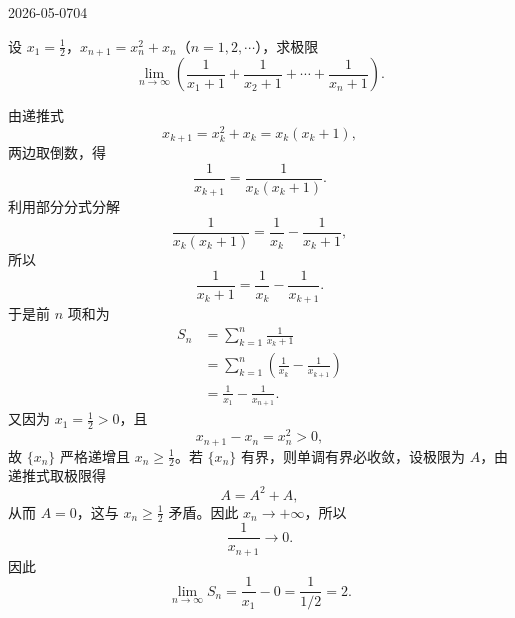 \begin{mistake}{2026-05-07}{04}

\begin{problemcontent}
设 \(x_1=\frac12\)，\(x_{n+1}=x_n^2+x_n\)（\(n=1,2,\cdots\)），求极限
\[
\lim_{n\to\infty}\left(\frac{1}{x_1+1}+\frac{1}{x_2+1}+\cdots+\frac{1}{x_n+1}\right).
\]
\end{problemcontent}

\begin{solutioncontent}
由递推式
\[
x_{k+1}=x_k^2+x_k=x_k(x_k+1),
\]
两边取倒数，得
\[
\frac{1}{x_{k+1}}=\frac{1}{x_k(x_k+1)}.
\]
利用部分分式分解
\[
\frac{1}{x_k(x_k+1)}=\frac{1}{x_k}-\frac{1}{x_k+1},
\]
所以
\[
\frac{1}{x_k+1}=\frac{1}{x_k}-\frac{1}{x_{k+1}}.
\]
于是前 \(n\) 项和为
\[
\begin{aligned}
S_n&=\sum_{k=1}^n\frac{1}{x_k+1}\\
&=\sum_{k=1}^n\left(\frac{1}{x_k}-\frac{1}{x_{k+1}}\right)\\
&=\frac{1}{x_1}-\frac{1}{x_{n+1}}.
\end{aligned}
\]
又因为 \(x_1=\frac12>0\)，且
\[
x_{n+1}-x_n=x_n^2>0,
\]
故 \(\{x_n\}\) 严格递增且 \(x_n\ge \frac12\)。若 \(\{x_n\}\) 有界，则单调有界必收敛，设极限为 \(A\)，由递推式取极限得
\[
A=A^2+A,
\]
从而 \(A=0\)，这与 \(x_n\ge \frac12\) 矛盾。因此 \(x_n\to +\infty\)，所以
\[
\frac{1}{x_{n+1}}\to 0.
\]
因此
\[
\lim_{n\to\infty}S_n=\frac{1}{x_1}-0=\frac{1}{1/2}=2.
\]
\end{solutioncontent}


\end{mistake}
